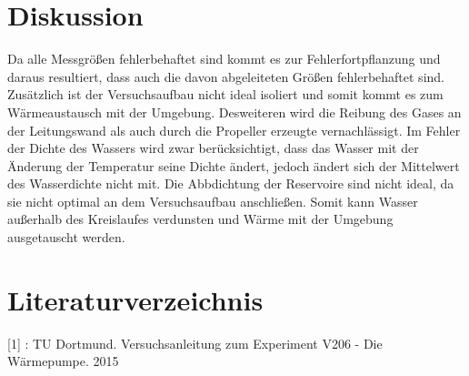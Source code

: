 \section{Diskussion}
\label{sec:Diskussion}
Da alle Messgrößen fehlerbehaftet sind kommt es zur Fehlerfortpflanzung und daraus resultiert, dass auch die davon abgeleiteten Größen fehlerbehaftet sind. Zusätzlich ist der Versuchsaufbau nicht ideal isoliert und somit kommt es zum Wärmeaustausch mit der Umgebung. Desweiteren wird die Reibung des Gases an der Leitungswand als auch durch die Propeller erzeugte vernachlässigt. Im Fehler der Dichte des Wassers wird zwar berücksichtigt, dass das Wasser mit der Änderung der Temperatur seine Dichte ändert, jedoch ändert sich der Mittelwert des Wasserdichte nicht mit. Die Abbdichtung der Reservoire sind nicht ideal, da sie nicht optimal an dem Versuchsaufbau anschließen. Somit kann Wasser außerhalb des Kreislaufes verdunsten und Wärme mit der Umgebung ausgetauscht werden.


\section{Literaturverzeichnis}
\label{sec:Literaturverzeichnis}

[1] : TU Dortmund. Versuchsanleitung zum Experiment V206 - Die Wärmepumpe. 2015
